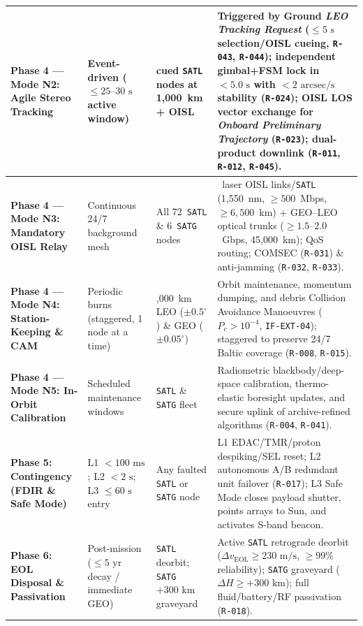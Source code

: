 \documentclass[11pt,a4paper]{article}
\providecommand{\abbr}[1]{#1}
\begin{document}
\begin{table}[H]
{\begin{tabularx}{\textwidth}{|>{\raggedright\arraybackslash}p{2.5cm}|>{\raggedright\arraybackslash}p{2.0cm}|>{\raggedright\arraybackslash}p{2.7cm}|>{\raggedright\arraybackslash}X|}
    \textbf{Phase 4 --- Mode N2: Agile Stereo Tracking} & Event-driven ($\le 25\text{--}30\text{ s}$ active window) & 2 cued \texttt{SATL} nodes at 1,000~km + \abbr{OISL} & Triggered by Ground \emph{LEO Tracking Request} ($\le 5\text{ s}$ selection/\abbr{OISL} cueing, \texttt{R-043}, \texttt{R-044}); independent gimbal+\abbr{FSM} lock in $< 5.0\text{ s}$ with $< 2\text{ arcsec/s}$ stability (\texttt{R-024}); \abbr{OISL} \abbr{LOS} vector exchange for \emph{Onboard Preliminary Trajectory} (\texttt{R-023}); dual-product downlink (\texttt{R-011}, \texttt{R-012}, \texttt{R-045}). \\ \hline
    \textbf{Phase 4 --- Mode N3: Mandatory \abbr{OISL} Relay} & Continuous 24/7 background mesh & All 72~\texttt{SATL} \& 6~\texttt{SATG} nodes & 4~laser \abbr{OISL} links/\texttt{SATL} (1,550~nm, $\ge 500$~Mbps, $\ge 6{,}500$~km) + \abbr{GEO}--\abbr{LEO} optical trunks ($\ge 1.5\text{--}2.0$~Gbps, 45,000~km); \abbr{QoS} routing; \abbr{COMSEC} (\texttt{R-031}) \& anti-jamming (\texttt{R-032}, \texttt{R-033}). \\ \hline
    \textbf{Phase 4 --- Mode N4: Station-Keeping \& \abbr{CAM}} & Periodic burns (staggered, 1 node at a time) & 1,000~km \abbr{LEO} ($\pm 0.5^\circ$) \& \abbr{GEO} ($\pm 0.05^\circ$) & Orbit maintenance, momentum dumping, and debris Collision Avoidance Manoeuvres ($P_c > 10^{-4}$, \texttt{IF-EXT-04}); staggered to preserve 24/7 Baltic coverage (\texttt{R-008}, \texttt{R-015}). \\ \hline
    \textbf{Phase 4 --- Mode N5: In-Orbit Calibration} & Scheduled maintenance windows & \texttt{SATL} \& \texttt{SATG} fleet & Radiometric blackbody/deep-space calibration, thermo-elastic boresight updates, and secure uplink of archive-refined algorithms (\texttt{R-004}, \texttt{R-041}). \\ \hline
    \textbf{Phase 5: Contingency (\abbr{FDIR} \& Safe Mode)} & L1 $< 100\text{ ms}$; L2 $< 2\text{ s}$; L3 $\le 60\text{ s}$ entry & Any faulted \texttt{SATL} or \texttt{SATG} node & L1 \abbr{EDAC}/\abbr{TMR}/proton despiking/\abbr{SEL} reset; L2 autonomous A/B redundant unit failover (\texttt{R-017}); L3 Safe Mode closes payload shutter, points arrays to Sun, and activates S-band beacon. \\ \hline
    \textbf{Phase 6: \abbr{EOL} Disposal \& Passivation} & Post-mission ($\le 5\text{ yr}$ decay / immediate \abbr{GEO}) & \texttt{SATL} deorbit; \texttt{SATG} $+300\text{ km}$ graveyard & Active \texttt{SATL} retrograde deorbit ($\Delta v_{\text{EOL}} \ge 230\text{ m/s}$, $\ge 99\%$ reliability); \texttt{SATG} graveyard ($\Delta H \ge +300\text{ km}$); full fluid/battery/RF passivation (\texttt{R-018}). \\ \hline
\end{tabularx}}
\end{table}
\end{document}
